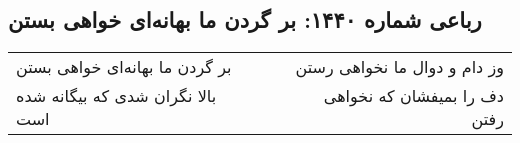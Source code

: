 \begin{center}
\section*{رباعی شماره ۱۴۴۰: بر گردن ما بهانه‌ای خواهی بستن}
\label{sec:1440}
\begin{longtable}{l p{0.5cm} r}
بر گردن ما بهانه‌ای خواهی بستن
&&
وز دام و دوال ما نخواهی رستن
\\
بالا نگران شدی که بیگانه شده است
&&
دف را بمیفشان که نخواهی رفتن
\\
\end{longtable}
\end{center}
